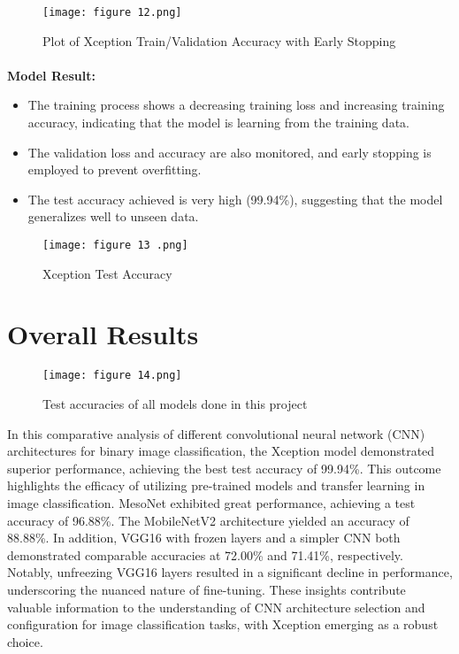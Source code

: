 \documentclass{article}
\begin{document}
\begin{figure}[h]
    \centering
    \texttt{[image: figure 12.png]}
    \caption{Plot of Xception Train/Validation Accuracy with Early Stopping}
    \label{fig:enter-label}
\end{figure}

\paragraph{}
\textbf{Model Result:}

\begin{itemize}
    \item The training process shows a decreasing training loss and increasing training accuracy, indicating that the model is learning from the training data.
    \item The validation loss and accuracy are also monitored, and early stopping is employed to prevent overfitting.
    \item The test accuracy achieved is very high (99.94\%), suggesting that the model generalizes well to unseen data.
\end{itemize}

\begin{figure}[h]
    \centering
    \texttt{[image: figure 13 .png]}
    \caption{Xception Test Accuracy}
    \label{fig:enter-label}
\end{figure}

\section{Overall Results}
\begin{figure}[h]
    \centering
    \texttt{[image: figure 14.png]}
    \caption{Test accuracies of all models done in this project}
    \label{fig:enter-label}
\end{figure}
In this comparative analysis of different convolutional neural network (CNN) architectures for binary image classification, the Xception model demonstrated superior performance, achieving the best test accuracy of 99.94\%. This outcome highlights the efficacy of utilizing pre-trained models and transfer learning in image classification. MesoNet exhibited great performance, achieving a test accuracy of 96.88\%. The MobileNetV2 architecture yielded an accuracy of 88.88\%. In addition, VGG16 with frozen layers and a simpler CNN both demonstrated comparable accuracies at 72.00\% and 71.41\%, respectively. Notably, unfreezing VGG16 layers resulted in a significant decline in performance, underscoring the nuanced nature of fine-tuning. These insights contribute valuable information to the understanding of CNN architecture selection and configuration for image classification tasks, with Xception emerging as a robust choice.
\end{document}
